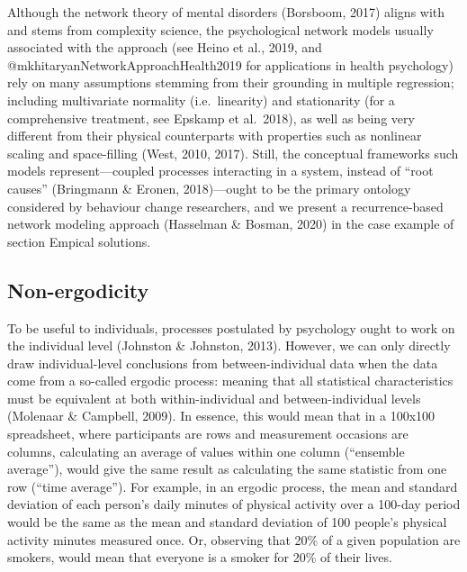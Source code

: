 \documentclass[
  british,
  man,floatsintext]{apa6}
\begin{document}
Although the network theory of mental disorders (Borsboom, 2017) aligns with and stems from complexity science, the psychological network models usually associated with the approach (see Heino et al., 2019, and @mkhitaryanNetworkApproachHealth2019 for applications in health psychology) rely on many assumptions stemming from their grounding in multiple regression; including multivariate normality (i.e.~linearity) and stationarity (for a comprehensive treatment, see Epskamp et al.~2018), as well as being very different from their physical counterparts with properties such as nonlinear scaling and space-filling (West, 2010, 2017). Still, the conceptual frameworks such models represent---coupled processes interacting in a system, instead of \enquote{root causes} (Bringmann \& Eronen, 2018)---ought to be the primary ontology considered by behaviour change researchers, and we present a recurrence-based network modeling approach (Hasselman \& Bosman, 2020) in the case example of section Empical solutions.

\hypertarget{non-ergodicity}{%
\subsection{Non-ergodicity}\label{non-ergodicity}}

To be useful to individuals, processes postulated by psychology ought to work on the individual level (Johnston \& Johnston, 2013). However, we can only directly draw individual-level conclusions from between-individual data when the data come from a so-called ergodic process: meaning that all statistical characteristics must be equivalent at both within-individual and between-individual levels (Molenaar \& Campbell, 2009). In essence, this would mean that in a 100x100 spreadsheet, where participants are rows and measurement occasions are columns, calculating an average of values within one column (\enquote{ensemble average}), would give the same result as calculating the same statistic from one row (\enquote{time average}). For example, in an ergodic process, the mean and standard deviation of each person's daily minutes of physical activity over a 100-day period would be the same as the mean and standard deviation of 100 people's physical activity minutes measured once. Or, observing that 20\% of a given population are smokers, would mean that everyone is a smoker for 20\% of their lives.
\end{document}
